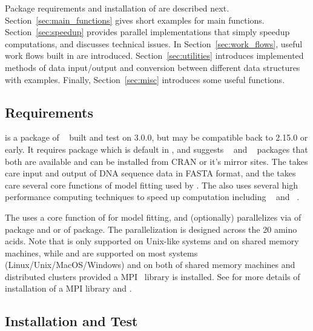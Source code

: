 Package requirements and installation of  are described
next. Section~\ref{sec:main_functions} gives short examples for
main functions.
Section~\ref{sec:speedup} provides parallel implementations that simply
speedup computations, and discusses technical issues.
In Section~\ref{sec:work_flows}, useful work flows
built in  are introduced.
Section~\ref{sec:utilities} introduces implemented methods of data
input/output and conversion between different data structures with examples.
Finally, Section~\ref{sec:misc} introduces some useful functions.


\subsection[Requirements]{Requirements}

 is a package of ~\citep{Rcore} built and test on
 3.0.0, but may be compatible back to 2.15.0 or early.
It requires  package which is default in , and
suggests ~\citep{seqinr} and ~\citep{VGAM}
packages that both are available and
can be installed from CRAN or it's mirror sites.
The  takes care input and output of DNA sequence data
in FASTA format, and the  takes care several core functions of
model fitting used by .
The  also uses several high performance computing
techniques to speed up computation including
~\citep{parallel} and
~\citep{Chen2012pbdMPIpackage}.

The  uses a core function  of  for
model fitting, and (optionally) parallelizes
via  of  package and
 or  of  package.
The parallelization is designed across the 20 amino acids.
Note that  is only supported on Unix-like systems
and on shared memory machines, while  and
 are supported on most systems (Linux/Unix/MacOS/Windows)
and on both of shared memory machines and distributed clusters
provided a MPI~\citep{MPI1994} library is installed.
See \citet{Chen2012pbdMPIvignette} for more details of installation of a
MPI library and .


\subsection[Installation and Test]{Installation and Test}

